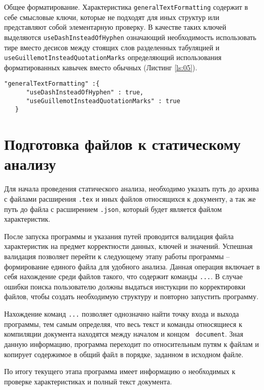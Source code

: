      Общее форматирование. Характеристика \verb|generalTextFormatting| содержит в себе смысловые ключи, которые не подходят для иных структур или представляют собой элементарную проверку. В качестве таких ключей выделяются \verb|useDashInsteadOfHyphen| означающий необходимость использовать тире вместо десисов между стоящих слов разделенных табуляцией и \verb|useGuillemotInsteadQuotationMarks| определяющий использования форматированных кавычек вместо обычных (Листинг \ref{ls:05}).

        \begin{lstlisting}[caption = {Пример общей конфигурации форматирования документа}, label={ls:05}]
     "generalTextFormatting" :{
      "useDashInsteadOfHyphen" : true,
      "useGuillemotInsteadQuotationMarks" : true
   }
     \end{lstlisting}   

\section{Подготовка файлов к статическому анализу}

Для начала проведения статического анализа, необходимо указать путь до архива с файлами расширения \verb|.tex| и иных файлов относящихся к документу, а так же путь до файла с расширением \verb|.json|, который будет является файлом характеристик. 

После запуска программы и указания путей проводится валидация файла характеристик на предмет корректности данных, ключей и значений. Успешная валидация позволяет перейти к следующему этапу работы программы -- формирование единого файла для удобного анализа. Данная операция включает в себя нахождение среди файлов такого, что содержит команды \verb|...|. В случае ошибки поиска пользователю должны выдаться инстукции по корректировки файлов, чтобы создать необходимую структуру и повторно запустить программу.

Нахождение команд  \verb|...| позволяет однозначно найти точку входа и выхода программы, тем самым определяя, что весь текст и команды относящиеся к компиляции документа находятся между началом и концом \guillemotright  \verb| document|. Зная данную информацию, программа переходит по относительным путям к файлам и копирует содержимое в общий файл в порядке, заданном в исходном файле. 

По итогу текущего этапа программа имеет информацию о необходимых к проверке характеристиках и полный текст документа. 

